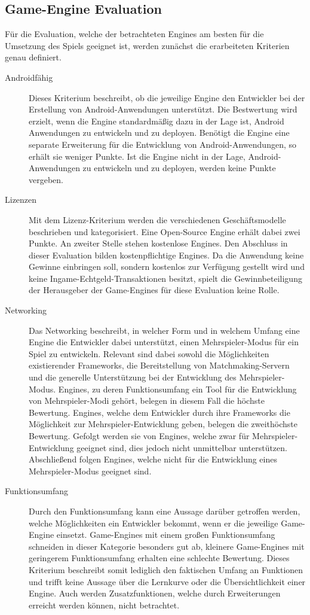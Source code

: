 \subsection{Game-Engine Evaluation}\label{ssec:engineeval}
	Für die Evaluation, welche der betrachteten Engines am besten  für die Umsetzung des Spiels geeignet ist, werden zunächst die erarbeiteten Kriterien genau definiert.
	\begin{description}
		\item[Androidfähig]{Dieses Kriterium beschreibt, ob die jeweilige Engine den Entwickler bei der Erstellung von Android-Anwendungen unterstützt. Die Bestwertung wird erzielt, wenn die Engine standardmäßig dazu in der Lage ist, Android Anwendungen zu entwickeln und zu deployen. Benötigt die Engine eine separate Erweiterung für die Entwicklung von Android-Anwendungen, so erhält sie weniger Punkte. Ist die Engine nicht in der Lage, Android-Anwendungen zu entwickeln und zu deployen, werden keine Punkte vergeben.}
		\item[Lizenzen]{Mit dem Lizenz-Kriterium werden die verschiedenen Geschäftsmodelle beschrieben und kategorisiert. Eine Open-Source Engine erhält dabei zwei Punkte. An zweiter Stelle stehen kostenlose Engines. Den Abschluss in dieser Evaluation bilden kostenpflichtige Engines. Da die Anwendung keine Gewinne einbringen soll, sondern kostenlos zur Verfügung gestellt wird und keine Ingame-Echtgeld-Transaktionen besitzt, spielt die Gewinnbeteiligung der Herausgeber der Game-Engines für diese Evaluation keine Rolle.}
		\item[Networking]{Das Networking beschreibt, in welcher Form und in welchem Umfang eine Engine die Entwickler dabei unterstützt, einen Mehrspieler-Modus für ein Spiel zu entwickeln. Relevant sind dabei sowohl die Möglichkeiten existierender Frameworks, die Bereitstellung von Matchmaking-Servern und die generelle Unterstützung bei der Entwicklung des Mehrspieler-Modus. Engines, zu deren Funktionsumfang ein Tool für die Entwicklung von Mehrspieler-Modi gehört, belegen in diesem Fall die höchste Bewertung. Engines, welche dem Entwickler durch ihre Frameworks die Möglichkeit zur Mehrspieler-Entwicklung geben, belegen die zweithöchste Bewertung. Gefolgt werden sie von Engines, welche zwar für Mehrspieler-Entwicklung geeignet sind, dies jedoch nicht unmittelbar unterstützen. Abschließend folgen Engines, welche nicht für die Entwicklung eines Mehrspieler-Modus geeignet sind.}
		\item[Funktionsumfang]{Durch den Funktionsumfang kann eine Aussage darüber getroffen werden, welche Möglichkeiten ein Entwickler bekommt, wenn er die jeweilige Game-Engine einsetzt. Game-Engines mit einem großen Funktionsumfang schneiden in dieser Kategorie besonders gut ab, kleinere Game-Engines mit geringerem Funktionsumfang erhalten eine schlechte Bewertung. Dieses Kriterium beschreibt somit lediglich den faktischen Umfang an Funktionen und trifft keine Aussage über die Lernkurve oder die Übersichtlichkeit einer Engine. Auch werden Zusatzfunktionen, welche durch Erweiterungen erreicht werden können, nicht betrachtet.}

\end{description}
